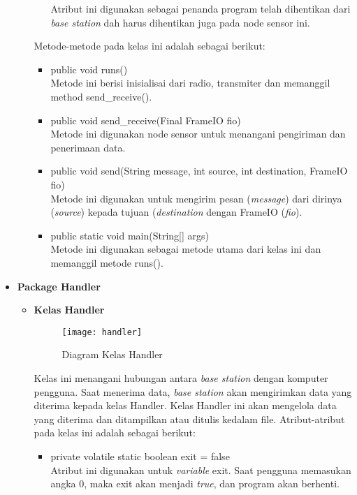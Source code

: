 \begin{itemize}
\begin{itemize}
\begin{itemize}
            Atribut ini digunakan sebagai penanda program telah dihentikan dari \textit{base station} dah harus dihentikan juga pada node sensor ini.
        \end{itemize}
        Metode-metode pada kelas ini adalah sebagai berikut:
        \begin{itemize}
            \item public void runs()\\
            Metode ini berisi inisialisai dari radio, transmiter dan memanggil method send\_receive().
            \item public void send\_receive(Final FrameIO fio)\\
            Metode ini digunakan node sensor untuk menangani pengiriman dan penerimaan data.
            \item public void send(String message, int source, int destination, FrameIO fio)\\
            Metode ini digunakan untuk mengirim pesan (\textit{message}) dari dirinya (\textit{source}) kepada tujuan (\textit{destination} dengan FrameIO (\textit{fio}).
            \item public static void main(String[] args)\\
            Metode ini digunakan sebagai metode utama dari kelas ini dan memanggil metode runs().
        \end{itemize}
    \end{itemize}
    \item \textbf{Package Handler}
    \begin{itemize}
        \item \textbf{Kelas Handler}\\
        \begin{figure}[h]
        	\centering
        	\texttt{[image: handler]}
        	\caption{Diagram Kelas Handler}
        	\label{fig:handler}
        \end{figure}
        Kelas ini menangani hubungan antara \textit{base station} dengan komputer pengguna. Saat menerima data, \textit{base station} akan mengirimkan data yang diterima kepada kelas Handler. Kelas Handler ini akan mengelola data yang diterima dan ditampilkan atau ditulis kedalam file.
        Atribut-atribut pada kelas ini adalah sebagai berikut:
        \begin{itemize}
            \item private volatile static boolean exit = false\\
            Atribut ini digunakan untuk \textit{variable} exit. Saat pengguna memasukan angka 0, maka exit akan menjadi \textit{true}, dan program akan berhenti.

\end{itemize}
\end{itemize}
\end{itemize}
